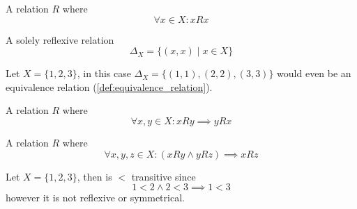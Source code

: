 \begin{definition}
   A relation \(R\) where
   \[\forall x \in X: xRx\]
\end{definition}

\begin{definition}
   A solely reflexive relation
   \[\Delta_X = \{(x, x) \mid x \in X\}\]
\end{definition}
\begin{example}
   Let \(X = \{1, 2, 3\}\), in this case
   \(\Delta_X = \{(1, 1), (2, 2), (3, 3)\}\)
   would even be an equivalence relation (\ref{def:equivalence_relation}).
\end{example}

\begin{definition}
   A relation \(R\) where
   \[\forall x, y \in X: xRy \implies yRx\]
\end{definition}

\begin{definition}
   A relation \(R\) where
   \[\forall x, y, z \in X: (xRy \land yRz) \implies xRz\]
\end{definition}
\begin{example}
   Let \(X = \{1, 2, 3\}\), then is \(<\) transitive since
   \[1 < 2 \land 2 < 3 \implies 1 < 3\]
   however it is not reflexive or symmetrical.
\end{example}

